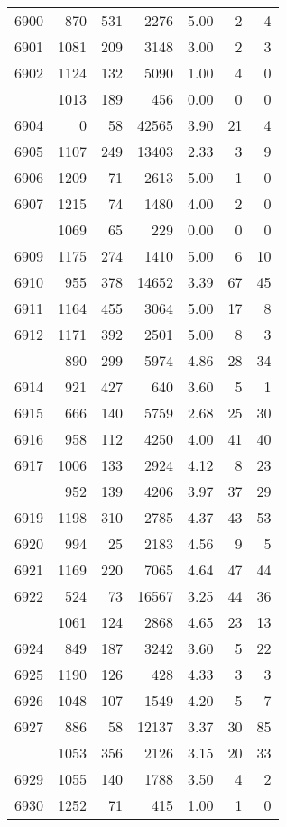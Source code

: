 \documentclass[
]{article}
\begin{document}
\begin{table}
\begin{tabular}[t]{lrrrrrr}
6900 & 870 & 531 & 2276 & 5.00 & 2 & 4\\
6901 & 1081 & 209 & 3148 & 3.00 & 2 & 3\\
6902 & 1124 & 132 & 5090 & 1.00 & 4 & 0\\
\addlinespace
6903 & 1013 & 189 & 456 & 0.00 & 0 & 0\\
6904 & 0 & 58 & 42565 & 3.90 & 21 & 4\\
6905 & 1107 & 249 & 13403 & 2.33 & 3 & 9\\
6906 & 1209 & 71 & 2613 & 5.00 & 1 & 0\\
6907 & 1215 & 74 & 1480 & 4.00 & 2 & 0\\
\addlinespace
6908 & 1069 & 65 & 229 & 0.00 & 0 & 0\\
6909 & 1175 & 274 & 1410 & 5.00 & 6 & 10\\
6910 & 955 & 378 & 14652 & 3.39 & 67 & 45\\
6911 & 1164 & 455 & 3064 & 5.00 & 17 & 8\\
6912 & 1171 & 392 & 2501 & 5.00 & 8 & 3\\
\addlinespace
6913 & 890 & 299 & 5974 & 4.86 & 28 & 34\\
6914 & 921 & 427 & 640 & 3.60 & 5 & 1\\
6915 & 666 & 140 & 5759 & 2.68 & 25 & 30\\
6916 & 958 & 112 & 4250 & 4.00 & 41 & 40\\
6917 & 1006 & 133 & 2924 & 4.12 & 8 & 23\\
\addlinespace
6918 & 952 & 139 & 4206 & 3.97 & 37 & 29\\
6919 & 1198 & 310 & 2785 & 4.37 & 43 & 53\\
6920 & 994 & 25 & 2183 & 4.56 & 9 & 5\\
6921 & 1169 & 220 & 7065 & 4.64 & 47 & 44\\
6922 & 524 & 73 & 16567 & 3.25 & 44 & 36\\
\addlinespace
6923 & 1061 & 124 & 2868 & 4.65 & 23 & 13\\
6924 & 849 & 187 & 3242 & 3.60 & 5 & 22\\
6925 & 1190 & 126 & 428 & 4.33 & 3 & 3\\
6926 & 1048 & 107 & 1549 & 4.20 & 5 & 7\\
6927 & 886 & 58 & 12137 & 3.37 & 30 & 85\\
\addlinespace
6928 & 1053 & 356 & 2126 & 3.15 & 20 & 33\\
6929 & 1055 & 140 & 1788 & 3.50 & 4 & 2\\
6930 & 1252 & 71 & 415 & 1.00 & 1 & 0\\

\end{tabular}
\end{table}
\end{document}
